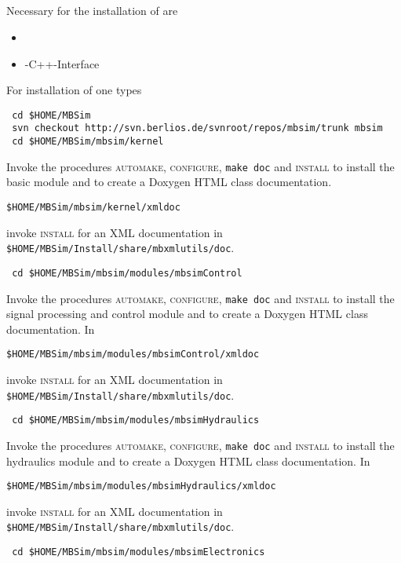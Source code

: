 \subsection{\MBSim}
Necessary for the installation of \MBSim{} are
\begin{itemize}
\item \FMatVec{}
\item \OpenMBV{}-C++-Interface
\end{itemize}
For installation of \MBSim{} one types
\begin{verbatim}
 cd $HOME/MBSim
 svn checkout http://svn.berlios.de/svnroot/repos/mbsim/trunk mbsim
 cd $HOME/MBSim/mbsim/kernel
\end{verbatim}
Invoke the procedures \textsc{automake, configure}, \texttt{make doc} and \textsc{install} to install the basic module and to create a Doxygen HTML class documentation. 
\begin{verbatim}
$HOME/MBSim/mbsim/kernel/xmldoc
\end{verbatim}
invoke \textsc{install} for an XML documentation in \texttt{\$HOME/MBSim/Install/share/mbxmlutils/doc}.
\begin{verbatim}
 cd $HOME/MBSim/mbsim/modules/mbsimControl
\end{verbatim}
Invoke the procedures \textsc{automake, configure}, \texttt{make doc} and \textsc{install} to install the signal processing and control module and to create a Doxygen HTML class documentation. In 
\begin{verbatim}
$HOME/MBSim/mbsim/modules/mbsimControl/xmldoc
\end{verbatim}
invoke \textsc{install} for an XML documentation in \texttt{\$HOME/MBSim/Install/share/mbxmlutils/doc}.
\begin{verbatim}
 cd $HOME/MBSim/mbsim/modules/mbsimHydraulics
\end{verbatim}
Invoke the procedures \textsc{automake, configure}, \texttt{make doc} and \textsc{install} to install the hydraulics module and to create a Doxygen HTML class documentation. In 
\begin{verbatim}
$HOME/MBSim/mbsim/modules/mbsimHydraulics/xmldoc
\end{verbatim}
invoke \textsc{install} for an XML documentation in \texttt{\$HOME/MBSim/Install/share/mbxmlutils/doc}.
\begin{verbatim}
 cd $HOME/MBSim/mbsim/modules/mbsimElectronics
\end{verbatim}
